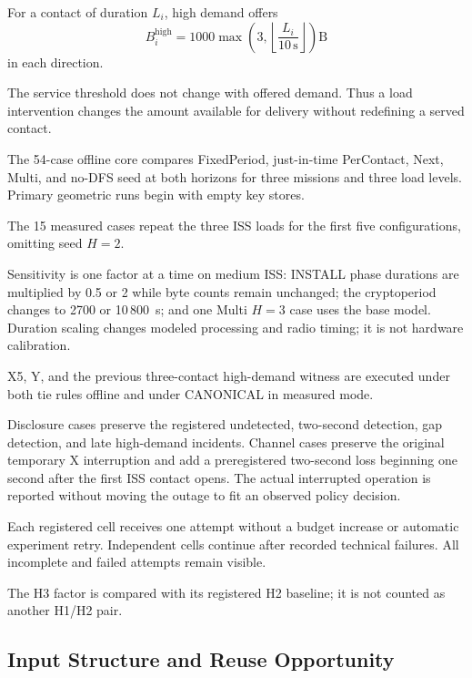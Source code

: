 \documentclass[conference]{IEEEtran}
\begin{document}
For a contact of duration $L_i$, high demand offers
\begin{equation}
    B_i^{\mathrm{high}}
    =
    1000
    \max\left(
        3,
        \left\lfloor
            \frac{L_i}{10\,\mathrm{s}}
        \right\rfloor
    \right)\mathrm{B}
    \label{eq:high-demand}
\end{equation}
in each direction.

The service threshold does not change with offered demand.
Thus a load intervention changes the amount available for
delivery without redefining a served contact.

The 54-case offline core compares FixedPeriod, just-in-time
PerContact, Next, Multi, and no-DFS seed at both horizons
for three missions and three load levels.
Primary geometric runs begin with empty key stores.

The 15 measured cases repeat the three ISS loads for the
first five configurations, omitting seed $H=2$.

Sensitivity is one factor at a time on medium ISS:
INSTALL phase durations are multiplied by 0.5 or 2 while
byte counts remain unchanged;
the cryptoperiod changes to 2700 or 10\,800~s;
and one Multi $H=3$ case uses the base model.
Duration scaling changes modeled processing and radio timing;
it is not hardware calibration.

X5, Y, and the previous three-contact high-demand witness
are executed under both tie rules offline and under
CANONICAL in measured mode.

Disclosure cases preserve the registered undetected,
two-second detection, gap detection, and late high-demand
incidents.
Channel cases preserve the original temporary X interruption
and add a preregistered two-second loss beginning one second
after the first ISS contact opens.
The actual interrupted operation is reported without moving
the outage to fit an observed policy decision.

Each registered cell receives one attempt without a budget
increase or automatic experiment retry.
Independent cells continue after recorded technical failures.
All incomplete and failed attempts remain visible.

The H3 factor is compared with its registered H2 baseline;
it is not counted as another H1/H2 pair.

\subsection{Input Structure and Reuse Opportunity}
\label{sec:input-structure}
\end{document}

